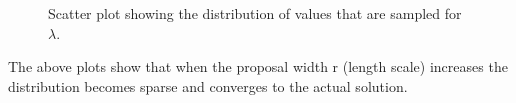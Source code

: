 \documentclass{article}
\begin{document}
\begin{figure}[H]
	\centerline{
		}
	\caption{Scatter plot showing the distribution of values that are sampled for $\lambda$.}
	\label{1.fig:r5_scat_L}
\end{figure}

The above plots show that when the proposal width r (length scale) increases the distribution becomes sparse and converges to the actual solution.
\end{document}
